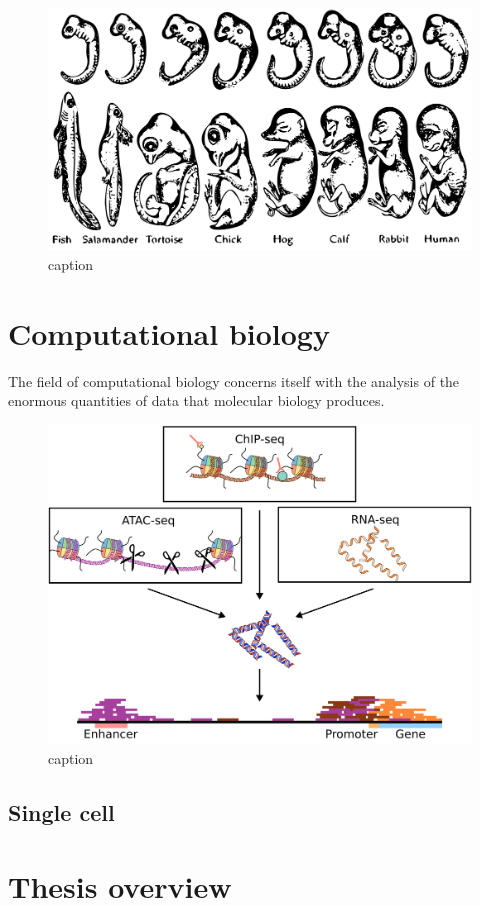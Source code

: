 \begin{figure}[H]
    \includegraphics[width=\linewidth]{ch1.Introduction/imgs/haeckel.png}
    \caption{caption}
    \label{fig:haeckel}
\end{figure}

\section{Computational biology}

The field of computational biology concerns itself with the analysis of the enormous quantities of data that molecular biology produces. 

\begin{figure}[H]
    \includegraphics[width=\linewidth]{ch1.Introduction/imgs/analysis.png}
    \caption{caption}
    \label{fig:analysis}
\end{figure}

\subsection{Single cell}

\section{Thesis overview}
